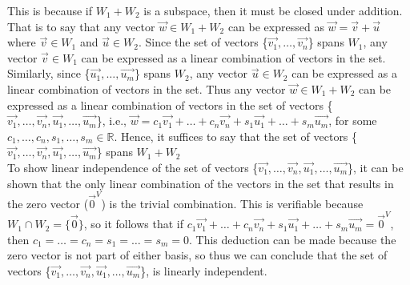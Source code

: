 \documentclass{report}
\begin{document}
\noindent This is because if $W_1 + W_2$ is a subspace, then it must be closed under addition. That is to say that any vector $\vec{w}\in W_1 + W_2$ can be expressed as $\vec{w} = \vec{v} + \vec{u}$ where $\vec{v}\in W_1$ and $\vec{u}\in W_2$. Since the set of vectors \{$\vec{v_1}, \dots, \vec{v_n}$\} spans $W_1$, any vector $\vec{v}\in W_1$ can be expressed as a linear combination of vectors in the set. Similarly, since \{$\vec{u_1}, \dots, \vec{u_m}$\} spans $W_2$, any vector $\vec{u}\in W_2$ can be expressed as a linear combination of vectors in the set. Thus any vector $\vec{w}\in W_1+W_2$ can be expressed as a linear combination of vectors in the set of vectors \{$\vec{v_1}, \ldots, \vec{v_n}, \vec{u_1}, \ldots, \vec{u_m}$\}, i.e., $\vec{w} = c_1\vec{v_1} + \ldots + c_n\vec{v_n} + s_1\vec{u_1} + \ldots + s_m\vec{u_m}$, for some $c_1,\ldots,c_n,s_1,\ldots,s_m\in\mathbb{R}$. Hence, it suffices to say that the set of vectors \{$\vec{v_1}, \ldots, \vec{v_n}, \vec{u_1}, \ldots, \vec{u_m}$\} spans $W_1 + W_2$ \\

\noindent To show linear independence of the set of vectors \{$\vec{v_1}, \ldots, \vec{v_n}, \vec{u_1}, \ldots, \vec{u_m}$\}, it can be shown that the only linear combination of the vectors in the set that results in the zero vector ($\vec{0}^V$) is the trivial combination. This is verifiable because $W_1\cap W_2 = \{\vec{0}\}$, so it follows that if $c_1\vec{v_1} + \ldots + c_n\vec{v_n} + s_1\vec{u_1} + \ldots + s_m\vec{u_m} = \vec{0}^V$, then $c_1 = \ldots = c_n = s_1 = \ldots = s_m = 0$. This deduction can be made because the zero vector is not part of either basis, so thus we can conclude that the set of vectors \{$\vec{v_1}, \ldots, \vec{v_n}, \vec{u_1}, \ldots, \vec{u_m}$\}, is linearly independent. \\
\end{document}
